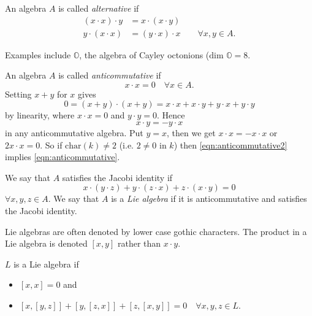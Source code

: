 \begin{definition}
  An algebra $A$ is called \emph{alternative} if
  \begin{align*}
    (x \cdot x) \cdot y &= x \cdot (x \cdot y)\\
    y \cdot (x \cdot x) &= (y \cdot x) \cdot x \qquad \forall x,y \in A.
  \end{align*}
\end{definition}
Examples include $\mathbb{O}$, the algebra of Cayley octonions ($\text{dim } \mathbb{O} = 8$.

\begin{definition}
  An algebra $A$ is called \emph{anticommutative} if
  \begin{equation}\label{eqn:anticommutative}
    x \cdot x = 0 \quad \forall x \in A.
  \end{equation}
  Setting $x+y$ for $x$ gives
  \[
    0 = (x+y) \cdot (x+y) = x \cdot x + x \cdot y + y \cdot x + y \cdot y
  \]
  by linearity, where $x \cdot x = 0$ and $y \cdot y = 0$. Hence
  \begin{equation}\label{eqn:anticommutative2}
    x \cdot y = -y \cdot x
  \end{equation}
  in any anticommutative algebra. Put $y=x$, then we get $x \cdot x = -x \cdot x$ or $2 x \cdot x = 0$. So if $\text{char}(k) \not= 2$ (i.e. $2 \not= 0$ in $k$) then \ref{eqn:anticommutative2} implies \ref{eqn:anticommutative}.
\end{definition}

\begin{definition}
  We say that $A$ satisfies the Jacobi identity if
  \[
    x \cdot (y \cdot z) + y \cdot (z \cdot x) + z \cdot (x \cdot y) = 0
  \]
  $\forall x,y,z \in A$. We say that $A$ is a \emph{Lie algebra} if it is anticommutative and satisfies the Jacobi identity.
\end{definition}

\begin{remark}
  Lie algebras are often denoted by lower case gothic characters. The product in a Lie algebra is denoted $[x,y]$ rather than $x \cdot y$.

  $L$ is a Lie algebra if
  \begin{itemize}
    \item $[x,x] = 0$ and
    \item $[x,[y,z]] + [y,[z,x]] + [z,[x,y]] = 0 \quad \forall x,y,z \in L$.
  \end{itemize}
\end{remark}

